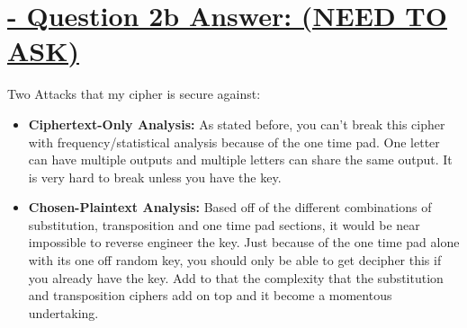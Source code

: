 \documentclass{article}
\begin{document}
\section{\underline{ - Question 2b Answer: (NEED TO ASK)}}
Two Attacks that my cipher is secure against:
\begin{itemize}
	\item \textbf{Ciphertext-Only Analysis: }As stated before, you can't break this cipher with frequency/statistical analysis because of the one time pad. One letter can have multiple outputs and multiple letters can share the same output. It is very hard to break unless you have the key.
	\item \textbf{Chosen-Plaintext Analysis: }Based off of the different combinations of substitution, transposition and one time pad sections, it would be near impossible to reverse engineer the key. Just because of the one time pad alone with its one off random key, you should only be able to get decipher this if you already have the key. Add to that the complexity that the substitution and transposition ciphers add on top and it become a momentous undertaking.   
\end{itemize}
\end{document}
